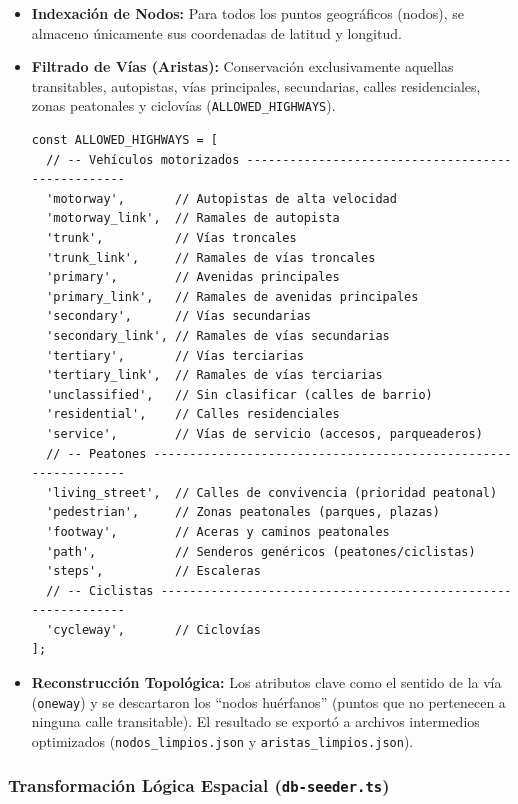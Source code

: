 \begin{itemize}
\item \textbf{Indexación de Nodos:} 
Para todos los puntos geográficos (nodos), se almaceno únicamente 
sus coordenadas de latitud y longitud.

\item \textbf{Filtrado de Vías (Aristas):} 
Conservación exclusivamente aquellas transitables, 
autopistas, vías principales, secundarias, calles residenciales, 
zonas peatonales y ciclovías (\texttt{ALLOWED\_HIGHWAYS}).

\begin{lstlisting}
const ALLOWED_HIGHWAYS = [
  // -- Vehículos motorizados --------------------------------------------------
  'motorway',       // Autopistas de alta velocidad
  'motorway_link',  // Ramales de autopista
  'trunk',          // Vías troncales
  'trunk_link',     // Ramales de vías troncales
  'primary',        // Avenidas principales
  'primary_link',   // Ramales de avenidas principales
  'secondary',      // Vías secundarias
  'secondary_link', // Ramales de vías secundarias
  'tertiary',       // Vías terciarias
  'tertiary_link',  // Ramales de vías terciarias
  'unclassified',   // Sin clasificar (calles de barrio)
  'residential',    // Calles residenciales
  'service',        // Vías de servicio (accesos, parqueaderos)
  // -- Peatones ---------------------------------------------------------------
  'living_street',  // Calles de convivencia (prioridad peatonal)
  'pedestrian',     // Zonas peatonales (parques, plazas)
  'footway',        // Aceras y caminos peatonales
  'path',           // Senderos genéricos (peatones/ciclistas)
  'steps',          // Escaleras
  // -- Ciclistas --------------------------------------------------------------
  'cycleway',       // Ciclovías
];
\end{lstlisting}

\item \textbf{Reconstrucción Topológica:} 
Los atributos clave como el sentido de la vía (\texttt{oneway}) 
y se descartaron los ``nodos huérfanos'' (puntos que no pertenecen a ninguna calle 
transitable). El resultado se exportó a archivos intermedios optimizados 
(\texttt{nodos\_limpios.json} y \texttt{aristas\_limpios.json}).
\end{itemize}

\subsubsection*{\hspace{0.7cm}Transformación Lógica Espacial (\texttt{db-seeder.ts})}

